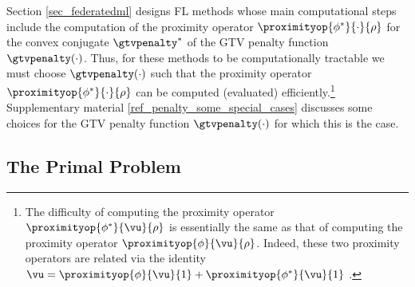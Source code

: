\documentclass[lettersize,journal]{IEEEtran}
\begin{document}
Section \ref{sec_federatedml} designs FL methods whose main computational steps include the computation of 
the proximity operator $\proximityop{\phi^{*}}{\cdot}{\rho}$ for the convex conjugate $\gtvpenalty^{*}$ of the 
GTV penalty function $\gtvpenalty(\cdot)$. Thus, for these methods to be computationally tractable we must 
choose $\gtvpenalty(\cdot)$ such that the proximity operator $\proximityop{\phi^{*}}{\cdot}{\rho}$ can be computed (evaluated) efficiently.\footnote{The difficulty 
	of computing the proximity operator $\proximityop{\phi^{*}}{\vu}{\rho}$ is essentially the same as that 
	of computing the proximity operator $\proximityop{\phi}{\vu}{\rho}$. Indeed, these two proximity operators 
	are related via the identity $\vu = \proximityop{\phi}{\vu}{1}+ \proximityop{\phi^{*}}{\vu}{1}$  \cite{ProximalMethods}.}
Supplementary material \ref{ref_penalty_some_special_cases} discusses some choices for the GTV penalty function $\gtvpenalty(\cdot)$ 
for which this is the case. 

\subsection{The Primal Problem}
\label{sec_primal_problem}
%
%
\end{document}
